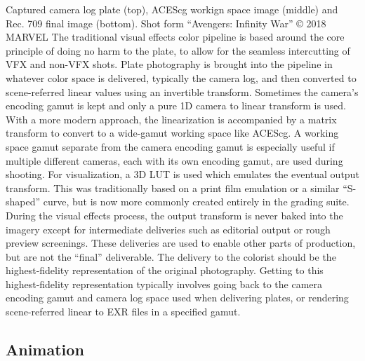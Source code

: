 Captured camera log plate (top), ACEScg workign space image (middle) and Rec. 709 final image (bottom). Shot form “Avengers: Infinity War”
© 2018 MARVEL
The traditional visual effects color pipeline is based around the core principle of doing no harm to the plate, to allow for the seamless intercutting of VFX and non-VFX shots. Plate photography is brought into the pipeline in whatever color space is delivered, typically the camera log, and then converted to scene-referred linear values using an invertible transform. Sometimes the camera’s encoding gamut is kept and only a pure 1D camera to linear transform is used. With a more modern approach, the linearization is accompanied by a matrix transform to convert to a wide-gamut working space like ACEScg. A working space gamut separate from the camera encoding gamut is especially useful if multiple different cameras, each with its own encoding gamut, are used during shooting. For visualization, a 3D LUT is used which emulates the eventual output transform. This was traditionally based on a print film emulation or a similar “S-shaped” curve, but is now more commonly created entirely in the grading suite. During the visual effects process, the output transform is never baked into the imagery except for intermediate deliveries such as editorial output or rough preview screenings. These deliveries are used to enable other parts of production, but are not the “final” deliverable. The delivery to the colorist should be the highest-fidelity representation of the original photography. Getting to this highest-fidelity representation typically involves going back to the camera encoding gamut and camera log space used when delivering plates, or rendering scene-referred linear to EXR files in a specified gamut.

\subsection{Animation}




